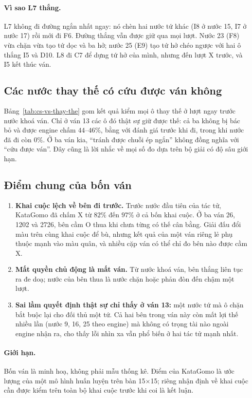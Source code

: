 \paragraph{Vì sao L7 thắng.} L7 không đi đường ngắn nhất ngay: nó chèn hai nước tứ khác (I8 ở nước 15, I7 ở nước 17) rồi
mới đi F6. Đường thắng vẫn được giữ qua mọi lượt. Nước 23 (F8) vừa chặn vừa tạo tứ dọc và ba hở; nước 25 (E9) tạo tứ hở
chéo ngược với hai ô thắng I5 và D10. L8 đi C7 để dựng tứ hở của mình, nhưng đến lượt X trước, và I5 kết thúc ván.


\subsection{Các nước thay thế có cứu được ván không}
Bảng~\ref{tab:cs-vs-thay-the} gom kết quả kiểm mọi ô thay thế ở lượt ngay trước nước khoá ván. Chỉ ở ván 13 các ô đó
thật sự giữ được thế: cả ba không bị bác bỏ và được engine chấm $44$--$46\%$, bằng với đánh giá trước khi đi, trong khi
nước đã đi còn $0\%$. Ở ba ván kia, ``tránh được chuỗi ép ngắn'' không đồng nghĩa với ``cứu được ván''. Đây cũng là lời
nhắc về mọi số đo dựa trên bộ giải có độ sâu giới hạn.


\subsection{Điểm chung của bốn ván}
\label{sec:cs-vs-chung}
\begin{enumerate}
  \item \textbf{Khai cuộc lệch về bên đi trước.} Trước nước đầu tiên của tác tử, KataGomo đã chấm X từ $82\%$ đến $97\%$ ở
  cả bốn khai cuộc. Ở ba ván 26, 1202 và 2726, bên cầm O thua khi chưa từng có thế cân bằng. Giải đấu đổi màu trên cùng
  khai cuộc để bù, nhưng kết quả của một ván riêng lẻ phụ thuộc mạnh vào màu quân, và nhiều cặp ván có thể chỉ đo bên nào
  được cầm X.
  \item \textbf{Mất quyền chủ động là mất ván.} Từ nước khoá ván, bên thắng liên tục ra đe doạ; nước của bên thua là nước
  chặn hoặc phản đòn đến chậm một lượt.
  \item \textbf{Sai lầm quyết định thật sự chỉ thấy ở ván 13:} một nước tứ mà ô chặn bắt buộc lại cho đối thủ một tứ. Cả
  hai bên trong ván này còn mất lợi thế nhiều lần (nước 9, 16, 25 theo engine) mà không có trọng tài nào ngoài engine
  nhận ra, cho thấy lỗi nhìn xa vẫn phổ biến ở hai tác tử mạnh nhất.
\end{enumerate}

\paragraph{Giới hạn.} Bốn ván là minh hoạ, không phải mẫu thống kê. Điểm của KataGomo là ước lượng của một mô hình huấn
luyện trên bàn 15$\times$15; riêng nhận định về khai cuộc cần được kiểm trên toàn bộ khai cuộc trước khi coi là kết luận.
